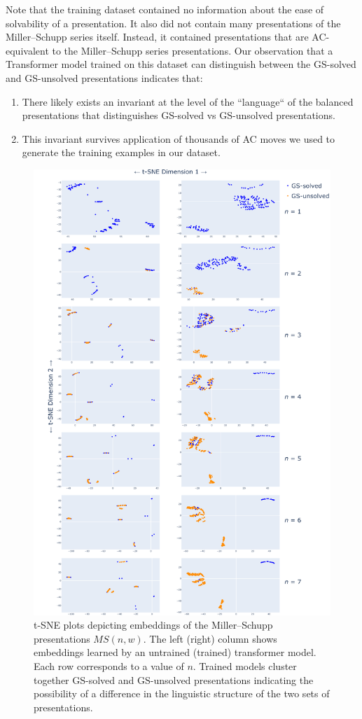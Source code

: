 Note that the training dataset contained no information about the ease of solvability of a presentation.
It also did not contain many presentations of the Miller--Schupp series itself.
Instead, it contained presentations that are AC-equivalent to the Miller--Schupp series presentations.
Our observation that a Transformer model trained on this dataset can distinguish between the GS-solved and GS-unsolved presentations indicates that:
\begin{enumerate}[label=\alph*)]
	\item There likely exists an invariant at the level of the ``language`` of the balanced presentations that distinguishes GS-solved vs GS-unsolved presentations.
	\item This invariant survives application of thousands of AC moves we used to generate the training examples in our dataset.
\end{enumerate}

\begin{figure}
	\centering
	\includegraphics[scale=0.16]{fig/embeddings.pdf}
	\captionsetup{width=1.1\textwidth}
	\caption{t-SNE plots depicting embeddings of the Miller--Schupp presentations $MS(n, w)$.
	The left (right) column shows embeddings learned by an untrained (trained) transformer model.
	Each row corresponds to a value of $n$.
	Trained models cluster together GS-solved and GS-unsolved presentations indicating the possibility of a difference in the linguistic structure of the two sets of presentations.}
	\label{fig:tsne_embeddings}
\end{figure}
